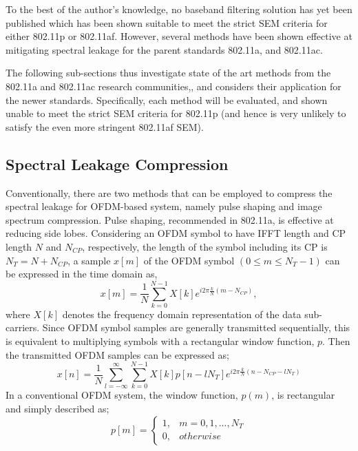 To the best of the author's knowledge, no baseband filtering solution has yet been published which has been shown suitable to meet the strict SEM criteria for either 802.11p or 802.11af.
However, several methods have been shown effective at mitigating spectral leakage for the parent standards 802.11a, and 802.11ac.

The following sub-sections thus investigate state of the art methods from the 802.11a and 802.11ac research communities,, and considers their application for the newer standards.
Specifically, each method will be evaluated, and shown unable to meet the strict SEM criteria for 802.11p (and hence is very unlikely to satisfy the even more stringent 802.11af SEM). 

\subsection{Spectral Leakage Compression}
Conventionally, there are two methods that can be employed to compress the spectral leakage for OFDM-based system, namely pulse shaping and image spectrum compression. Pulse shaping, recommended in 802.11a, is effective at reducing side lobes. 
Considering an OFDM symbol to have IFFT length and CP length $N$ and $N_{CP}$, respectively, the length of the symbol including its CP is $N_{T} = N + N_{CP}$,
a sample $x[m]$ of the OFDM symbol $(0\leq m \leq N_{T}-1)$ can be expressed in the time domain as,
\begin{equation}
\label{xm}
x[m] = \frac{1}{N}\sum_{k=0}^{N-1} X[k] e^{i2\pi\frac{k}{N}(m-N_{CP})},
\end{equation}
where $X[k]$ denotes the frequency domain representation of the data sub-carriers.
Since OFDM symbol samples are generally transmitted sequentially, this is equivalent to multiplying symbols with a rectangular window function, $p$.
Then the transmitted OFDM samples can be expressed as;
\begin{equation}
\label{equ:xn2}
x[n] = \frac{1}{N}\sum_{l=-\infty}^{\infty} \sum_{k=0}^{N-1} X[k] p[n-l N_{T}] e^{i2\pi\frac{k}{N}(n-N_{CP}-l N_{T})}
\end{equation}
In a conventional OFDM system, the window function, $p(m)$, is rectangular and simply described as;
\begin{equation}
\label{equ:pm}
 p[m] =\begin{cases}1, & m = 0,1, ..., N_{T} \\  0, & otherwise \end{cases}
\end{equation}

